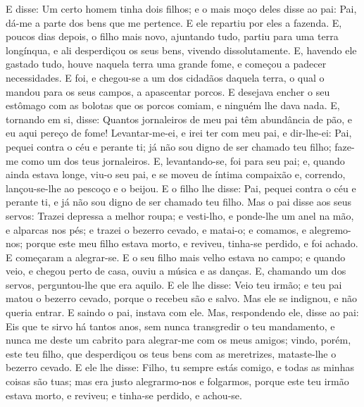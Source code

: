 E disse: Um certo homem tinha dois filhos; e o mais moço
deles disse ao pai: Pai, dá-me a parte dos bens que me pertence. E
ele repartiu por eles a fazenda. E, poucos dias depois, o
filho mais novo, ajuntando tudo, partiu para uma terra longínqua, e
ali desperdiçou os seus bens, vivendo dissolutamente. E,
havendo ele gastado tudo, houve naquela terra uma grande fome, e
começou a padecer necessidades. E foi, e chegou-se a um dos
cidadãos daquela terra, o qual o mandou para os seus campos, a
apascentar porcos. E desejava encher o seu estômago com as
bolotas que os porcos comiam, e ninguém lhe dava nada. E,
tornando em si, disse: Quantos jornaleiros de meu pai têm abundância
de pão, e eu aqui pereço de fome! Levantar-me-ei, e irei ter
com meu pai, e dir-lhe-ei: Pai, pequei contra o céu e perante ti;
já não sou digno de ser chamado teu filho; faze-me como um
dos teus jornaleiros. E, levantando-se, foi para seu pai; e,
quando ainda estava longe, viu-o seu pai, e se moveu de íntima
compaixão e, correndo, lançou-se-lhe ao pescoço e o beijou. E
o filho lhe disse: Pai, pequei contra o céu e perante ti, e já não
sou digno de ser chamado teu filho. Mas o pai disse aos seus
servos: Trazei depressa a melhor roupa; e vesti-lho, e ponde-lhe um
anel na mão, e alparcas nos pés; e trazei o bezerro cevado, e
matai-o; e comamos, e alegremo-nos; porque este meu filho
estava morto, e reviveu, tinha-se perdido, e foi achado. E começaram
a alegrar-se. E o seu filho mais velho estava no campo; e
quando veio, e chegou perto de casa, ouviu a música e as danças.
E, chamando um dos servos, perguntou-lhe que era aquilo.
E ele lhe disse: Veio teu irmão; e teu pai matou o bezerro
cevado, porque o recebeu são e salvo. Mas ele se indignou, e
não queria entrar. E saindo o pai, instava com ele. Mas,
respondendo ele, disse ao pai: Eis que te sirvo há tantos anos, sem
nunca transgredir o teu mandamento, e nunca me deste um cabrito para
alegrar-me com os meus amigos; vindo, porém, este teu filho,
que desperdiçou os teus bens com as meretrizes, mataste-lhe o
bezerro cevado. E ele lhe disse: Filho, tu sempre estás
comigo, e todas as minhas coisas são tuas; mas era justo
alegrarmo-nos e folgarmos, porque este teu irmão estava morto, e
reviveu; e tinha-se perdido, e achou-se.

\medskip

